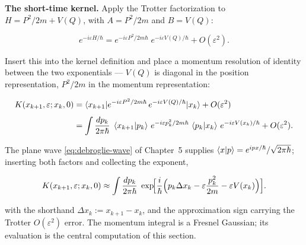 \medskip\noindent\textbf{The short-time kernel.} Apply the Trotter factorization to $H = P^2/2m + V(Q)$, with $A = P^2/2m$ and $B = V(Q)$:
\begin{linenomath}
\begin{equation*}
e^{-i\varepsilon H/\hbar} = e^{-i\varepsilon P^2/2m\hbar}\;e^{-i\varepsilon V(Q)/\hbar} + O(\varepsilon^2) .
\end{equation*}
\end{linenomath}
Insert this into the kernel definition and place a momentum resolution of identity between the two exponentials --- $V(Q)$ is diagonal in the position representation, $P^2/2m$ in the momentum representation:
\begin{linenomath}
\begin{equation*}
\begin{aligned}
K(x_{k+1},\varepsilon; x_k,0)
&= \braket{x_{k+1}|e^{-i\varepsilon P^2/2m\hbar}\,e^{-i\varepsilon V(Q)/\hbar}|x_k} + O(\varepsilon^2) \\[4pt]
&= \int \frac{dp_k}{2\pi\hbar}\;
   \braket{x_{k+1}|p_k}\,e^{-i\varepsilon p_k^2/2m\hbar}\,
   \braket{p_k|x_k}\,e^{-i\varepsilon V(x_k)/\hbar} + O(\varepsilon^2) .
\end{aligned}
\end{equation*}
\end{linenomath}
The plane wave \eqref{eq:debroglie-wave} of Chapter~5 supplies $\braket{x|p} = e^{ipx/\hbar}/\sqrt{2\pi\hbar}$; inserting both factors and collecting the exponent,
\begin{linenomath}
\begin{equation}
K(x_{k+1},\varepsilon; x_k,0)
\approx \int \frac{dp_k}{2\pi\hbar}\;
\exp\!\Bigl[\frac{i}{\hbar}\Bigl(p_k\Delta x_k - \varepsilon\frac{p_k^2}{2m} - \varepsilon V(x_k)\Bigr)\Bigr] .
\end{equation}
\end{linenomath}
with the shorthand $\Delta x_k := x_{k+1} - x_k$, and the approximation sign carrying the Trotter $O(\varepsilon^2)$ error. The momentum integral is a Fresnel Gaussian; its evaluation is the central computation of this section.

